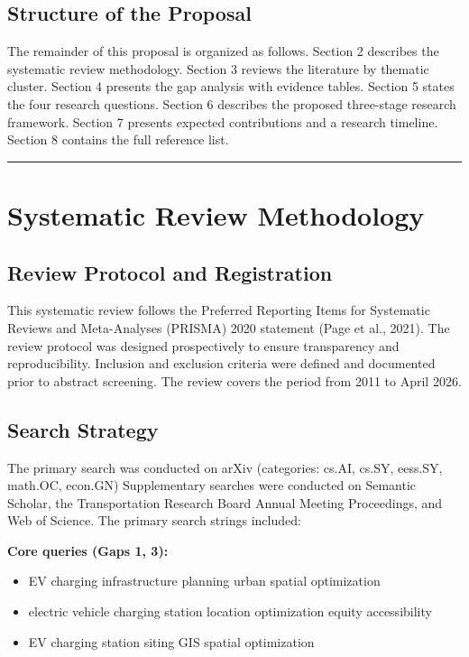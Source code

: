 \documentclass[letterpaper, 12pt, oneside, doublespacing]{Thesis}
\begin{document}
\section{Structure of the Proposal}

The remainder of this proposal is organized as follows. Section 2 describes the systematic review methodology. Section 3 reviews the literature by thematic cluster. Section 4 presents the gap analysis with evidence tables. Section 5 states the four research questions. Section 6 describes the proposed three-stage research framework. Section 7 presents expected contributions and a research timeline. Section 8 contains the full reference list.

\bigskip\noindent\rule{\linewidth}{0.4pt}\bigskip


\chapter{Systematic Review Methodology}

\section{Review Protocol and Registration}

This systematic review follows the Preferred Reporting Items for Systematic Reviews and Meta-Analyses (PRISMA) 2020 statement (Page et al., 2021). The review protocol was designed prospectively to ensure transparency and reproducibility. Inclusion and exclusion criteria were defined and documented prior to abstract screening. The review covers the period from 2011 to April 2026.

\section{Search Strategy}

The primary search was conducted on arXiv (categories: cs.AI, cs.SY, eess.SY, math.OC, econ.GN) Supplementary searches were conducted on Semantic Scholar, the Transportation Research Board Annual Meeting Proceedings, and Web of Science. The primary search strings included:


\noindent \textbf{Core queries (Gaps 1, 3):}

\begin{itemize}
  \item EV charging infrastructure planning urban spatial optimization
  \item electric vehicle charging station location optimization equity accessibility
  \item EV charging station siting GIS spatial optimization
\end{itemize}
\end{document}
